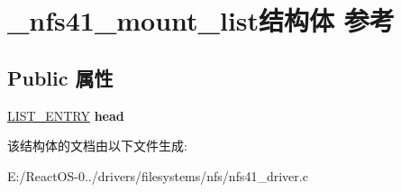 \hypertarget{struct__nfs41__mount__list}{}\section{\+\_\+nfs41\+\_\+mount\+\_\+list结构体 参考}
\label{struct__nfs41__mount__list}
\subsection*{Public 属性}
\begin{DoxyCompactItemize}
\item 
\mbox{\label{struct__nfs41__mount__list_a9cfa60f2b4870fbf5f8959a27765b70e}} 
\hyperlink{struct___l_i_s_t___e_n_t_r_y}{L\+I\+S\+T\+\_\+\+E\+N\+T\+RY} {\bfseries head}
\end{DoxyCompactItemize}


该结构体的文档由以下文件生成\+:\begin{DoxyCompactItemize}
\item 
E\+:/\+React\+O\+S-\/0../drivers/filesystems/nfs/nfs41\+\_\+driver.\+c\end{DoxyCompactItemize}
